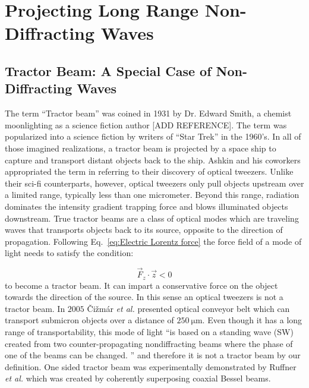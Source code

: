 \chapter{Projecting Long Range Non-Diffracting Waves}
\label{ch:intermediate}

\section{Tractor Beam: A Special Case of  Non-Diffracting Waves}

The term ``Tractor beam'' was coined in 1931 by Dr. Edward Smith, a chemist moonlighting as a science fiction author [ADD REFERENCE]. The term was popularized into a science fiction by writers of ``Star Trek'' in the 1960's. In all of those imagined realizations, a tractor beam is projected by a space ship to capture and transport distant objects back to the ship. 
Ashkin and his coworkers \cite{block1992} appropriated the term in referring to their discovery of optical tweezers. Unlike their sci-fi counterparts, however, optical tweezers only pull objects upstream over a limited range, typically less than one micrometer. Beyond this range, radiation dominates the intensity gradient trapping force and blows illuminated objects downstream. True tractor beams are a class of optical modes which are traveling waves that transports objects back to its source, opposite to the direction of propagation. Following Eq.~\eqref{eq:Electric Lorentz force} the force field of a mode of light needs to satisfy the condition:

\begin{equation}
\label{eq:Tractor Fz condition}
\vec{F}_{z}\cdot \vec{z} <0
\end{equation}
to become a tractor beam. It can impart a conservative force on the object towards the direction of the source.  In this sense an optical tweezers is not a tractor beam. In $2005 $ \v Ci\v zm\'ar \emph{et al.} \cite{cizmar2005} presented optical conveyor belt which can transport submicron objects over a distance of $\SI{250}{\um}$. Even though it has a long range of transportability, this mode of light ``is based on a standing wave (SW) created from two counter-propagating nondiffracting beams where the phase of one of the beams can be changed. \cite{cizmar2005}'' and therefore it is not a tractor beam by our definition. One sided tractor beam was experimentally demonstrated by Ruffner \emph{et al.} \cite{ruffner2012prl} which was created by coherently superposing coaxial Bessel beams.

